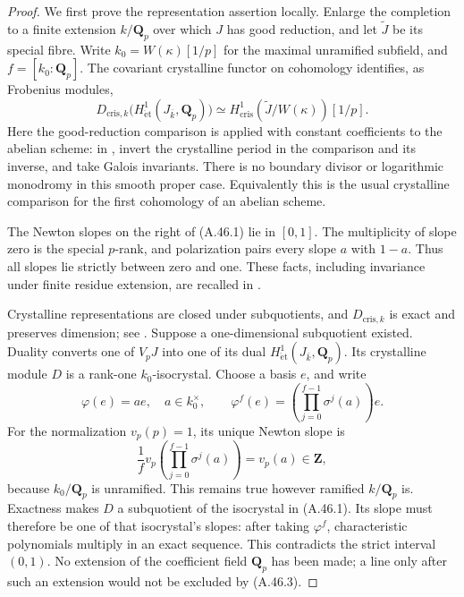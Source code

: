 \begin{proof}
We first prove the representation assertion locally. Enlarge the
completion to a finite extension \(k/\mathbf Q_p\) over which \(J\)
has good reduction, and let \(\widetilde J\) be its special fibre.
Write \(k_0=W(\kappa)[1/p]\) for the maximal unramified subfield,
and \(f=[k_0:\mathbf Q_p]\). The covariant crystalline functor
on cohomology identifies, as Frobenius modules,
\[
 D_{\mathrm{cris},k}\bigl(H^1_{\mathrm{\acute et}}
              (J_{\bar k},\mathbf Q_p)\bigr)
       \simeq H^1_{\mathrm{cris}}(\widetilde J/W(\kappa))[1/p].
                                                        \tag{A.46.1}
\]
Here the good-reduction comparison is applied with constant
coefficients to the abelian scheme: in
\cite[Section 5, Corollary 4 and the subsequent Remarks 1--5,
printed pp.256--260]{RootFaltings2002}, invert the crystalline period
in the comparison and its inverse, and take Galois invariants.
There is no boundary divisor or logarithmic monodromy in this
smooth proper case. Equivalently this is the usual crystalline
comparison for the first cohomology of an abelian scheme.

The Newton slopes on the right of (A.46.1) lie in \([0,1]\).
The multiplicity of slope zero is the special \(p\)-rank, and
polarization pairs every slope \(a\) with \(1-a\).
Thus all slopes lie strictly between zero and one. These facts,
including invariance under finite residue extension, are recalled
in \cite[Sections 2.2.1 and 2.2.3]{RootAchterPries2013}.

Crystalline representations are closed under subquotients, and
\(D_{\mathrm{cris},k}\) is exact and preserves dimension;
see \cite[Theorem 5.2.1(1)--(3) and Proposition 9.1.6]{fghBrinonConrad}.
Suppose a one-dimensional subquotient existed. Duality converts
one of \(V_pJ\) into one of its dual
\(H^1_{\mathrm{\acute et}}(J_{\bar k},\mathbf Q_p)\).
Its crystalline module \(D\) is a rank-one \(k_0\)-isocrystal.
Choose a basis \(e\), and write
\[
       \varphi(e)=a e,\quad a\in k_0^\times,
       \qquad
       \varphi^f(e)=
         \left(\prod_{j=0}^{f-1}\sigma^j(a)\right)e .
                                                        \tag{A.46.2}
\]
For the normalization \(v_p(p)=1\), its unique Newton slope is
\[
 \frac1f v_p\left(\prod_{j=0}^{f-1}\sigma^j(a)\right)
                         =v_p(a)\in\mathbf Z,          \tag{A.46.3}
\]
because \(k_0/\mathbf Q_p\) is unramified. This remains true
however ramified \(k/\mathbf Q_p\) is. Exactness makes \(D\)
a subquotient of the isocrystal in (A.46.1). Its slope must
therefore be one of that isocrystal's slopes: after taking
\(\varphi^f\), characteristic polynomials multiply in an exact
sequence. This contradicts the strict interval \((0,1)\).
No extension of the coefficient field \(\mathbf Q_p\) has been
made; a line only after such an extension would not be excluded
by (A.46.3).


\end{proof}
